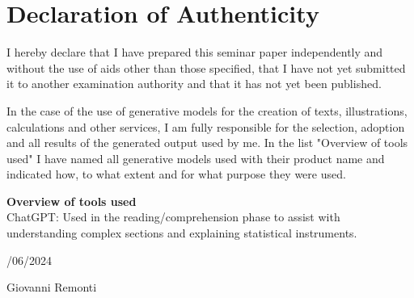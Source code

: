 \chapter*{Declaration of Authenticity}

I hereby declare that I have prepared this seminar paper independently and without the use of aids other than those specified, that I have not yet submitted it to another examination authority and that it has not yet been published.

\vspace{\baselineskip}

\noindent In the case of the use of generative models for the creation of texts, illustrations, calculations and other services, I am fully responsible for the selection, adoption and all results of the generated output used by me. In the list "Overview of tools used" I have named all generative models used with their product name and indicated how, to what extent and for what purpose they were used.

\vspace{\baselineskip}

\noindent\textbf{Overview of tools used}\\
ChatGPT: Used in the reading/comprehension phase to assist with understanding complex sections and explaining statistical instruments.

\vspace{\baselineskip}

\begin{multicols}{2}
/06/2024

\columnbreak

\begin{flushright}
Giovanni Remonti
\end{flushright}
\end{multicols}

